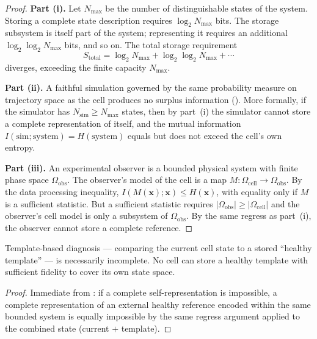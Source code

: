 \begin{proof}
\textbf{Part (i).}  Let $N_{\max}$ be the number of distinguishable states
of the system.  Storing a complete state description requires
$\log_2 N_{\max}$ bits.  The storage subsystem is itself part of the
system; representing it requires an additional $\log_2\!\log_2 N_{\max}$
bits, and so on.  The total storage requirement
\begin{equation}
  S_{\mathrm{total}}
  = \log_2 N_{\max} + \log_2\!\log_2 N_{\max} + \cdots
  \label{eq:storage-diverge}
\end{equation}
diverges, exceeding the finite capacity $N_{\max}$.

\textbf{Part (ii).}  A faithful simulation governed by the same probability
measure on trajectory space as the cell produces no surplus information
().  More formally, if the simulator has
$N_{\mathrm{sim}} \geq N_{\max}$ states, then by part~(i) the simulator
cannot store a complete representation of itself, and the mutual information
$I(\mathrm{sim}; \mathrm{system}) = H(\mathrm{system})$ equals but does
not exceed the cell's own entropy.

\textbf{Part (iii).}  An experimental observer is a bounded physical
system with finite phase space $\Omega_{\mathrm{obs}}$.  The observer's
model of the cell is a map
$M : \Omega_{\mathrm{cell}} \to \Omega_{\mathrm{obs}}$.
By the data processing inequality, $I(M(\mathbf{x}); \mathbf{x}) \leq H(\mathbf{x})$,
with equality only if $M$ is a sufficient statistic.  But a sufficient
statistic requires $|\Omega_{\mathrm{obs}}| \geq |\Omega_{\mathrm{cell}}|$
and the observer's cell model is only a subsystem of $\Omega_{\mathrm{obs}}$.
By the same regress as part~(i), the observer cannot store a complete
reference.
\end{proof}

\begin{corollary}
\label{cor:template-incompleteness}
Template-based diagnosis --- comparing the current cell state to a stored
``healthy template'' --- is necessarily incomplete.  No cell can store a
healthy template with sufficient fidelity to cover its own state space.
\end{corollary}

\begin{proof}
Immediate from : if a complete self-representation
is impossible, a complete representation of an external healthy reference
encoded within the same bounded system is equally impossible by the same
regress argument applied to the combined state (current $+$ template).
\end{proof}

